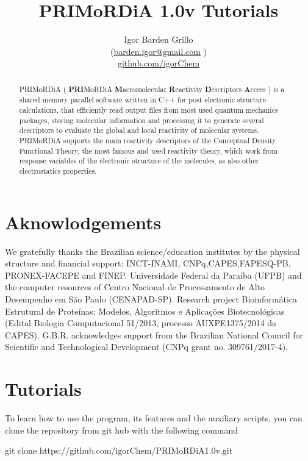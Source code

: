 \documentclass[a4paper,11pt]{refart}
\title{PRIMoRDiA 1.0v Tutorials}
\author{Igor Barden Grillo \\(\url{barden.igor@gmail.com} )\\\url{github.com/igorChem}}
\begin{document}
	\maketitle
	
\begin{abstract}
	PRIMoRDiA ( \textbf{PRI}MoRDiA \textbf{M}acromolecular \textbf{R}eactivity \textbf{D}escriptors \textbf{A}ccess ) is a shared memory parallel software written in C++ for post electronic structure calculations, that efficiently read output files from most used quantum mechanics packages, storing molecular information and processing it to generate several descriptors to evaluate the global and local reactivity of molecular systems. PRIMoRDiA supports the main reactivity descriptors of the Conceptual Density Functional Theory, the most famous and used reactivity theory, which work from response variables of the electronic structure of the molecules, as also other electrostatics properties.
\end{abstract}
\newpage
\section*{Aknowlodgements}

We gratefully thanks the Brazilian science/education institutes by the physical structure and financial support: INCT-INAMI, CNPq,CAPES,FAPESQ-PB, PRONEX-FACEPE and FINEP. Universidade Federal da Paraíba (UFPB) and the computer resources of Centro Nacional de Processamento de Alto Desempenho em São Paulo (CENAPAD-SP). 		
Research project Bioinformática Estrutural de Proteínas: Modelos, Algoritmos e Aplicações Biotecnológicas (Edital Biologia Computacional 51/2013, processo AUXPE1375/2014 da CAPES). G.B.R. acknowledges support from the Brazilian National Council for Scientific and Technological Development (CNPq grant no. 309761/2017-4).

\section{Tutorials}

To learn how to use the program, its features and the auxiliary scripts, you can clone the repository from git hub with the following command

\hspace*{-\leftmarginwidth}
\begin{minipage}{\fullwidth}
	\begin{commandshell}git clone https://github.com/igorChem/PRIMoRDiA1.0v.git\end{commandshell}
\end{minipage}
\end{document}
